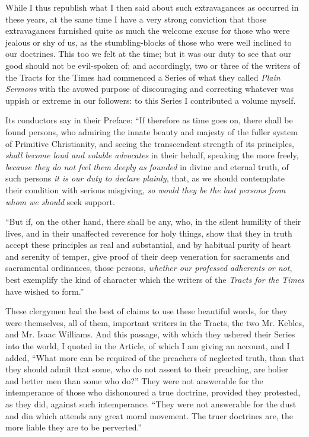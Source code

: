 While I thus republish what I then said about such extravagances as
occurred in these years, at the same time I have a very strong
conviction that those extravagances furnished quite as much the welcome
excuse for those who were jealous or shy of us, as the stumbling-blocks
of those who were well inclined to our doctrines. This too we felt at
the time; but it was our duty to see that our good should not be
evil-spoken of; and accordingly, two or three of the writers of the
Tracts for the Times had commenced a Series of what they called \emph{Plain Sermons} with the avowed purpose of discouraging and
correcting whatever was uppish or extreme in our followers: to this
Series I contributed a volume myself.

Its conductors say in their Preface: ``If therefore as time goes
on, there shall be found persons, who admiring the innate beauty and
majesty of the fuller system of Primitive Christianity, and seeing the
transcendent strength of its principles, \emph{shall become loud and
voluble advocates} in their behalf, speaking the more freely, \emph{because
they do not feel them deeply as founded} in divine and eternal truth,
of such persons \emph{it is our duty to declare plainly}, that, as we
should contemplate their condition with serious misgiving, \emph{so would
they be the last persons from whom we should} seek support.

``But if, on the other hand, there shall be any, who, in the
silent humility of their lives, and in their unaffected reverence for
holy things, show that they in truth accept these principles as real and
substantial, and by habitual purity of heart and serenity of temper,
give proof of their deep veneration for sacraments and sacramental
ordinances, those persons, \emph{whether our professed adherents or not},
best exemplify the kind of character which the writers of the \emph{Tracts for
the Times} have wished to form.''

These clergymen had the best of claims to use these beautiful words,
for they were themselves, all of them, important writers in the Tracts,
the two Mr. Kebles, and Mr. Isaac Williams. And this passage, with which
they ushered their Series into the world, I quoted in the Article, of
which I am giving an account, and I added, ``What more can be
required of the preachers of neglected truth, than that they should
admit that some, who do not assent to their preaching, are holier and
better men than some who do?'' They were not answerable for the
intemperance of those who dishonoured a true doctrine, provided they protested, as they did, against such intemperance. ``They were
not answerable for the dust and din which attends any great moral
movement. The truer doctrines are, the more liable they are to be
perverted.''

